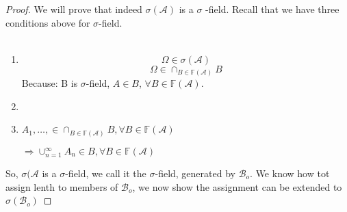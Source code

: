 \documentclass[11pt,fleqn]{book} %
\begin{document}
\begin{proof} We will prove that indeed $\sigma(\mathscr{A})$ is a $\sigma$ -field. Recall that we have three conditions above for $\sigma$-field.\\
\\
	\begin{enumerate}[label = (\roman*)]
		\item $$\Omega \in \sigma(\mathscr{A})$$ 
			$$\Omega \in \cap_{B \in \mathbb{F}(\mathscr{A})} B $$
			Because: B is $\sigma$-field, $A \in B$, $\forall B \in \mathbb{F}(\mathscr{A})$.
		\item 

		\item $A_1, \dots, \in \cap_{B \in \mathbb{F}(\mathscr{A})} B, \forall  B  \in \mathbb{F}(\mathscr{A})$

		$\Rightarrow \cup^\infty_{n =1} A_n \in B, \forall B \in \mathbb{F}(\mathscr{A})$

	\end{enumerate}

	So, $\sigma(\mathscr{A}$ is a $\sigma$-field, we call it the $\sigma$-field, generated by $\mathscr{B}_o$. We know how tot assign lenth to members of $\mathscr{B}_o$, we now show the assignment can be extended to $\sigma(\mathscr{B}_o)$ 


\end{proof}
\end{document}
